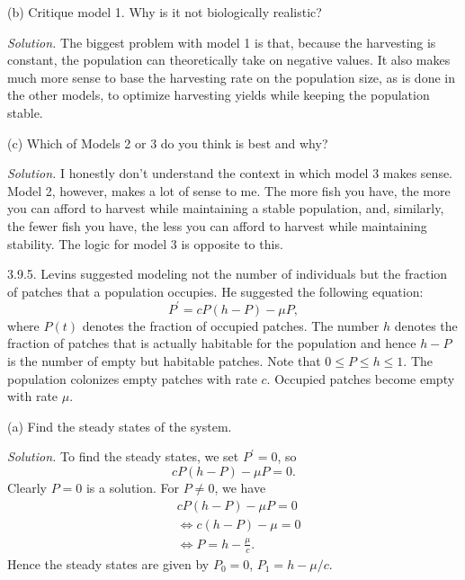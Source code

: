 \documentclass{article}
\begin{document}
\vspace{5mm}

(b) Critique model 1. Why is it not biologically realistic?

\textit{Solution.}
The biggest problem with model 1 is that, because the harvesting is
constant, the population can theoretically take on negative values. It
also makes much more sense to base the harvesting rate on the population
size, as is done in the other models, to optimize harvesting yields
while keeping the population stable.

\vspace{5mm}

(c) Which of Models 2 or 3 do you think is best and why?

\textit{Solution.}
I honestly don't understand the context in which model 3 makes sense.
Model 2, however, makes a lot of sense to me. The more fish you have,
the more you can afford to harvest while maintaining a stable
population, and, similarly, the fewer fish you have, the less you can
afford to harvest while maintaining stability. The logic for model 3
is opposite to this.

\newpage

3.9.5. Levins suggested modeling not the number of individuals but the
fraction of patches that a population occupies. He suggested the
following equation:
%
\begin{equation*}
    P^\prime = c P (h - P) - \mu P
    ,
\end{equation*}
%
where $P(t)$ denotes the fraction of occupied patches. The number $h$
denotes the fraction of patches that is actually habitable for the
population and hence $h - P$ is the number of empty but habitable
patches. Note that $0 \leq P \leq h \leq 1$. The population colonizes
empty patches with rate $c$. Occupied patches become empty with rate
$\mu$.

(a) Find the steady states of the system.

\textit{Solution.}
To find the steady states, we set $P^\prime = 0$, so
%
\begin{equation*}
    c P (h - P) - \mu P = 0
    .
\end{equation*}
%
Clearly $P = 0$ is a solution. For $P \neq 0$, we have
%
\begin{align*}
    &c P (h - P) - \mu P = 0 \\
    &\iff c (h - P) - \mu = 0 \\
    &\iff P = h - \frac{\mu}{c}
    .
\end{align*}
%
Hence the steady states are given by $P_0 = 0$, $P_1 = h - \mu / c$.
\end{document}
